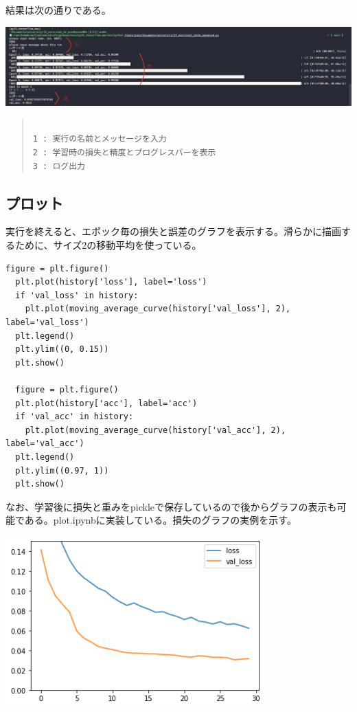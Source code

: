 \documentclass[platex,dvipdfmx]{jsarticle}
\begin{document}
結果は次の通りである。

\includegraphics[width=15cm]{ex4_output.png}

\begin{quote}
\begin{verbatim}

1 : 実行の名前とメッセージを入力
2 : 学習時の損失と精度とプログレスバーを表示
3 : ログ出力
\end{verbatim}
\end{quote}

\subsection{プロット}

実行を終えると、エポック毎の損失と誤差のグラフを表示する。滑らかに描画するために、サイズ2の移動平均を使っている。

\begin{lstlisting}[caption=ex\_advanced.py]
  figure = plt.figure()
  plt.plot(history['loss'], label='loss')
  if 'val_loss' in history:
    plt.plot(moving_average_curve(history['val_loss'], 2), label='val_loss')
  plt.legend()
  plt.ylim((0, 0.15))
  plt.show()
  
  figure = plt.figure()
  plt.plot(history['acc'], label='acc')
  if 'val_acc' in history:
    plt.plot(moving_average_curve(history['val_acc'], 2), label='val_acc')
  plt.legend()
  plt.ylim((0.97, 1))
  plt.show()
\end{lstlisting}

なお、学習後に損失と重みをpickleで保存しているので後からグラフの表示も可能である。plot.ipynbに実装している。損失のグラフの実例を示す。

\includegraphics[width=10cm]{loss.png}
\end{document}
